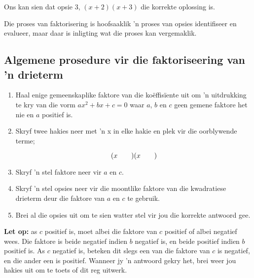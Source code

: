 \par
Ons kan sien dat opsie 3, $(x+2)(x+3)$ die korrekte oplossing is. \par
Die proses van faktorisering is hoofsaaklik ’n proses van opsies identifiseer en evalueer, maar daar is inligting wat die proses kan vergemaklik.\par 


\subsection*{Algemene prosedure vir die faktoriseering van 'n drieterm}

\begin{enumerate}[itemsep=5pt, label=\textbf{\arabic*}. ] 
\item Haal enige gemeenskaplike faktore van die koëffisïente uit om ’n uitdrukking te kry van die vorm $a{x}^{2}+bx+c=0$ waar $a$, $b$ en $c$ geen gemene faktore het nie en $a$ positief is.
\item Skryf twee hakies neer met ’n x in elke hakie en plek vir die oorblywende terme;

\begin{equation*}
(x\phantom{\rule{2.em}{0ex}})(x\phantom{\rule{2.em}{0ex}})
\end{equation*}
\item Skryf ’n stel faktore neer vir $a$ en $c$.
\item Skryf ’n stel opsies neer vir die moontlike faktore van die kwadratiese drieterm deur die faktore van $a$ en $c$ te gebruik.
\item Brei al die opsies uit om te sien watter stel vir jou die korrekte antwoord gee.
\end{enumerate}
 \textbf{Let op:} as $c$ positief is, moet albei die faktore van $c$ positief of albei negatief wees. Die faktore is beide negatief indien $b$ negatief is, en beide positief indien $b$ positief is. As $c$ negatief is, beteken dit slegs een van die faktore van $c$ is negatief, en die ander een is positief. Wanneer jy ’n antwoord gekry het, brei weer jou hakies uit om te toets of dit reg uitwerk.
